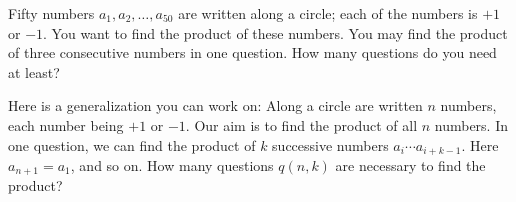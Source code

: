 Fifty numbers $a_1, a_2, \ldots, a_{50}$ are written along a circle; each of the numbers is $+1$ or $-1$. You want to find the product of these numbers. You may find the product of three consecutive numbers in one question. How many questions do you need at least?

Here is a generalization you can work on: Along a circle are written $n$ numbers, each number being $+1$ or $-1$. Our aim is to find the product of all $n$ numbers. In one question, we can find the product of $k$ successive numbers $a_i \cdots a_{i+k-1}$. Here $a_{n+1} = a_1$, and so on. How many questions $q(n, k)$ are necessary to find the product?

